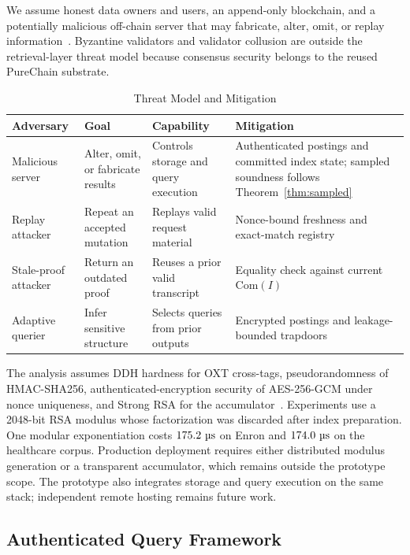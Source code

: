 \documentclass[journal]{IEEEtran}
\theoremstyle{tight}
\theoremstyle{remark}
\theoremstyle{plain}
\begin{document}
We assume honest data owners and users, an append-only blockchain, and a potentially malicious off-chain server that may fabricate, alter, omit, or replay information~\cite{Yang,Yin,Wu}. Byzantine validators and validator collusion are outside the retrieval-layer threat model because consensus security belongs to the reused PureChain substrate.

\begin{table}[!tb]
\centering
\caption{Threat Model and Mitigation}
\label{tab:threat}
\scriptsize
\setlength{\tabcolsep}{3pt}
\begin{tabular}{p{1.25cm}p{1.35cm}p{1.55cm}p{1.9cm}}
\toprule
\textbf{Adversary} & \textbf{Goal} & \textbf{Capability} & \textbf{Mitigation} \\
\midrule
Malicious server &
Alter, omit, or fabricate results &
Controls storage and query execution &
Authenticated postings and committed index state; sampled soundness follows Theorem~\ref{thm:sampled} \\

Replay attacker &
Repeat an accepted mutation &
Replays valid request material &
Nonce-bound freshness and exact-match registry \\

Stale-proof attacker &
Return an outdated proof &
Reuses a prior valid transcript &
Equality check against current \(\mathrm{Com}(I)\) \\

Adaptive querier &
Infer sensitive structure &
Selects queries from prior outputs &
Encrypted postings and leakage-bounded trapdoors \\
\bottomrule
\end{tabular}
\end{table}

The analysis assumes DDH hardness for OXT cross-tags, pseudorandomness of HMAC-SHA256, authenticated-encryption security of AES-256-GCM under nonce uniqueness, and Strong RSA for the accumulator~\cite{CamenischLysyanskaya2002}. Experiments use a 2048-bit RSA modulus whose factorization was discarded after index preparation. One modular exponentiation costs \(175.2~\text{\textmu s}\) on Enron and \(174.0~\text{\textmu s}\) on the healthcare corpus. Production deployment requires either distributed modulus generation or a transparent accumulator, which remains outside the prototype scope. The prototype also integrates storage and query execution on the same stack; independent remote hosting remains future work.

\subsection{Authenticated Query Framework}
\label{3C}
\end{document}
